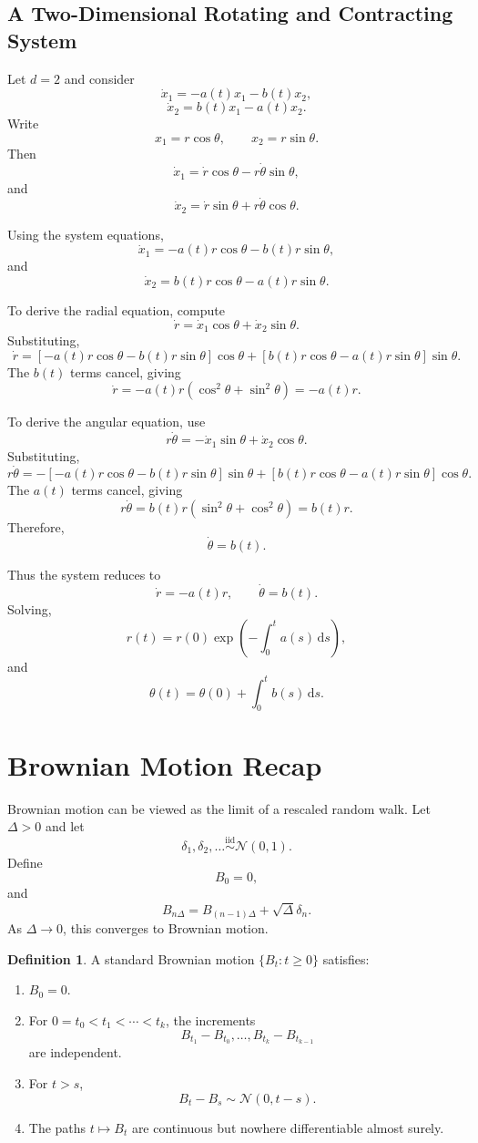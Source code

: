 \documentclass[12pt,oneside]{book}
\numberwithin{equation}{section}
\theoremstyle{definition}
\newtheorem{definition}{Definition}[section]
\theoremstyle{plain}
\theoremstyle{remark}
\newcommand{\iid}{\overset{\text{iid}}{\sim}}
\newcommand{\dd}{\,\mathrm{d}}
\newcommand{\Normal}{\mathcal{N}}
\begin{document}
\subsection{A Two-Dimensional Rotating and Contracting System}

Let $d=2$ and consider
\[
\dot{x}_1=-a(t)x_1-b(t)x_2,
\]
\[
\dot{x}_2=b(t)x_1-a(t)x_2.
\]
Write
\[
x_1=r\cos\theta,
\qquad
x_2=r\sin\theta.
\]
Then
\[
\dot{x}_1=\dot{r}\cos\theta-r\dot{\theta}\sin\theta,
\]
and
\[
\dot{x}_2=\dot{r}\sin\theta+r\dot{\theta}\cos\theta.
\]

Using the system equations,
\[
\dot{x}_1=-a(t)r\cos\theta-b(t)r\sin\theta,
\]
and
\[
\dot{x}_2=b(t)r\cos\theta-a(t)r\sin\theta.
\]

To derive the radial equation, compute
\[
\dot{r}
=
\dot{x}_1\cos\theta+\dot{x}_2\sin\theta.
\]
Substituting,
\[
\dot{r}
=
[-a(t)r\cos\theta-b(t)r\sin\theta]\cos\theta
+
[b(t)r\cos\theta-a(t)r\sin\theta]\sin\theta.
\]
The $b(t)$ terms cancel, giving
\[
\dot{r}
=
-a(t)r(\cos^2\theta+\sin^2\theta)
=
-a(t)r.
\]

To derive the angular equation, use
\[
r\dot{\theta}
=
-\dot{x}_1\sin\theta+\dot{x}_2\cos\theta.
\]
Substituting,
\[
r\dot{\theta}
=
-[ -a(t)r\cos\theta-b(t)r\sin\theta]\sin\theta
+
[b(t)r\cos\theta-a(t)r\sin\theta]\cos\theta.
\]
The $a(t)$ terms cancel, giving
\[
r\dot{\theta}
=
b(t)r(\sin^2\theta+\cos^2\theta)
=
b(t)r.
\]
Therefore,
\[
\dot{\theta}=b(t).
\]

Thus the system reduces to
\[
\dot{r}=-a(t)r,
\qquad
\dot{\theta}=b(t).
\]
Solving,
\[
r(t)=r(0)\exp\left(-\int_0^t a(s)\dd s\right),
\]
and
\[
\theta(t)=\theta(0)+\int_0^t b(s)\dd s.
\]

\section{Brownian Motion Recap}

Brownian motion can be viewed as the limit of a rescaled random walk. Let $\Delta>0$ and let
\[
\delta_1,\delta_2,\ldots \iid \Normal(0,1).
\]
Define
\[
B_0=0,
\]
and
\[
B_{n\Delta}
=
B_{(n-1)\Delta}+\sqrt{\Delta}\delta_n.
\]
As $\Delta\to 0$, this converges to Brownian motion.

\begin{definition}
A standard Brownian motion $\{B_t:t\ge 0\}$ satisfies:
\begin{enumerate}
\item $B_0=0$.
\item For $0=t_0<t_1<\cdots<t_k$, the increments
\[
B_{t_1}-B_{t_0},\ldots,B_{t_k}-B_{t_{k-1}}
\]
are independent.
\item For $t>s$,
\[
B_t-B_s\sim \Normal(0,t-s).
\]
\item The paths $t\mapsto B_t$ are continuous but nowhere differentiable almost surely.
\end{enumerate}
\end{definition}
\end{document}
